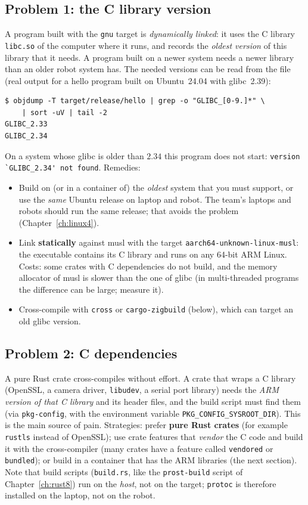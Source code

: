 \subsection*{Problem 1: the C library version}
A program built with the \verb!gnu! target is \emph{dynamically linked}: it uses the C library \verb!libc.so! of the computer where it runs, and records the \emph{oldest version} of this library that it needs. A program built on a newer system needs a newer library than an older robot system has. The needed versions can be read from the file (real output for a hello program built on Ubuntu~24.04 with glibc~2.39):
\begin{verbatim}
$ objdump -T target/release/hello | grep -o "GLIBC_[0-9.]*" \
    | sort -uV | tail -2
GLIBC_2.33
GLIBC_2.34
\end{verbatim}
On a system whose glibc is older than $2.34$ this program does not start: \verb!version `GLIBC_2.34' not found!. Remedies:
\begin{itemize}[nosep]
\item Build on (or in a container of) the \emph{oldest} system that you must support, or use the \emph{same} Ubuntu release on laptop and robot. The team's laptops and robots should run the same release; that avoids the problem (Chapter~\ref{ch:linux4}).
\item Link \textbf{statically} against musl with the target \verb!aarch64-unknown-linux-musl!: the executable contains its C library and runs on any 64-bit ARM Linux. Costs: some crates with C dependencies do not build, and the memory allocator of musl is slower than the one of glibc (in multi-threaded programs the difference can be large; measure it).
\item Cross-compile with \verb!cross! or \verb!cargo-zigbuild! (below), which can target an old glibc version.
\end{itemize}

\subsection*{Problem 2: C dependencies}
A pure Rust crate cross-compiles without effort. A crate that wraps a C library (OpenSSL, a camera driver, \verb!libudev!, a serial port library) needs the \emph{ARM version of that C library} and its header files, and the build script must find them (via \verb!pkg-config!, with the environment variable \verb!PKG_CONFIG_SYSROOT_DIR!). This is the main source of pain. Strategies: prefer \textbf{pure Rust crates} (for example \verb!rustls! instead of OpenSSL); use crate features that \emph{vendor} the C code and build it with the cross-compiler (many crates have a feature called \verb!vendored! or \verb!bundled!); or build in a container that has the ARM libraries (the next section). Note that build scripts (\verb!build.rs!, like the \verb!prost-build! script of Chapter~\ref{ch:rust8}) run on the \emph{host}, not on the target; \verb!protoc! is therefore installed on the laptop, not on the robot.

